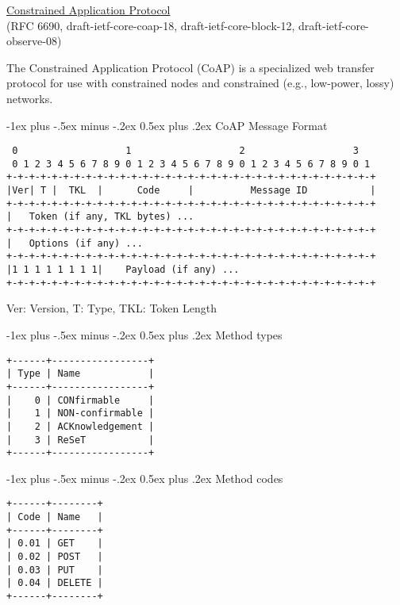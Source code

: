 \documentclass[10pt,landscape]{article}
\makeatletter
\renewcommand{\section}{\@startsection{section}{1}{0mm}%
                                {-1ex plus -.5ex minus -.2ex}%
                                {0.5ex plus .2ex}%
                                {\normalfont\large\bfseries}}
\makeatother
\begin{document}
\raggedright
\footnotesize
\begin{multicols}{3}


\setlength{\premulticols}{1pt}
\setlength{\postmulticols}{1pt}
\setlength{\multicolsep}{1pt}
\setlength{\columnsep}{2pt}

\begin{center}
     \Large{\underline{Constrained Application Protocol}} \\
     {\tiny
       (RFC 6690, draft-ietf-core-coap-18, draft-ietf-core-block-12,
       draft-ietf-core-observe-08)
     }
\end{center}

The Constrained Application Protocol (CoAP) is a specialized web
transfer protocol for use with constrained nodes and constrained
(e.g., low-power, lossy) networks.

\section{CoAP Message Format}
{\tiny
\begin{verbatim}
 0                   1                   2                   3
 0 1 2 3 4 5 6 7 8 9 0 1 2 3 4 5 6 7 8 9 0 1 2 3 4 5 6 7 8 9 0 1
+-+-+-+-+-+-+-+-+-+-+-+-+-+-+-+-+-+-+-+-+-+-+-+-+-+-+-+-+-+-+-+-+
|Ver| T |  TKL  |      Code     |          Message ID           |
+-+-+-+-+-+-+-+-+-+-+-+-+-+-+-+-+-+-+-+-+-+-+-+-+-+-+-+-+-+-+-+-+
|   Token (if any, TKL bytes) ...
+-+-+-+-+-+-+-+-+-+-+-+-+-+-+-+-+-+-+-+-+-+-+-+-+-+-+-+-+-+-+-+-+
|   Options (if any) ...
+-+-+-+-+-+-+-+-+-+-+-+-+-+-+-+-+-+-+-+-+-+-+-+-+-+-+-+-+-+-+-+-+
|1 1 1 1 1 1 1 1|    Payload (if any) ...
+-+-+-+-+-+-+-+-+-+-+-+-+-+-+-+-+-+-+-+-+-+-+-+-+-+-+-+-+-+-+-+-+
\end{verbatim}
Ver: Version, T: Type, TKL: Token Length
}

\section{Method types}
{\tiny
\begin{verbatim}
+------+-----------------+
| Type | Name            |
+------+-----------------+
|    0 | CONfirmable     |
|    1 | NON-confirmable |
|    2 | ACKnowledgement |
|    3 | ReSeT           |
+------+-----------------+
\end{verbatim}
}

\section{Method codes}
{\tiny
\begin{verbatim}
+------+--------+
| Code | Name   |
+------+--------+
| 0.01 | GET    |
| 0.02 | POST   |
| 0.03 | PUT    |
| 0.04 | DELETE |
+------+--------+
\end{verbatim}
}


\end{multicols}
\end{document}
